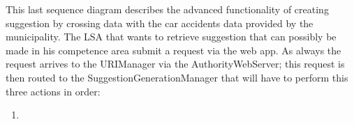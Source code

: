 This last sequence diagram describes the advanced functionality of creating suggestion by crossing data with the car accidents data provided by the municipality. The LSA that wants to retrieve suggestion that can possibly be made in his competence area submit a request via the web app. As always the request arrives to the URIManager via the AuthorityWebServer; this request is then routed to the SuggestionGenerationManager that will have to perform this three actions in order:
\begin{enumerate}
  \item 
\end{enumerate}

